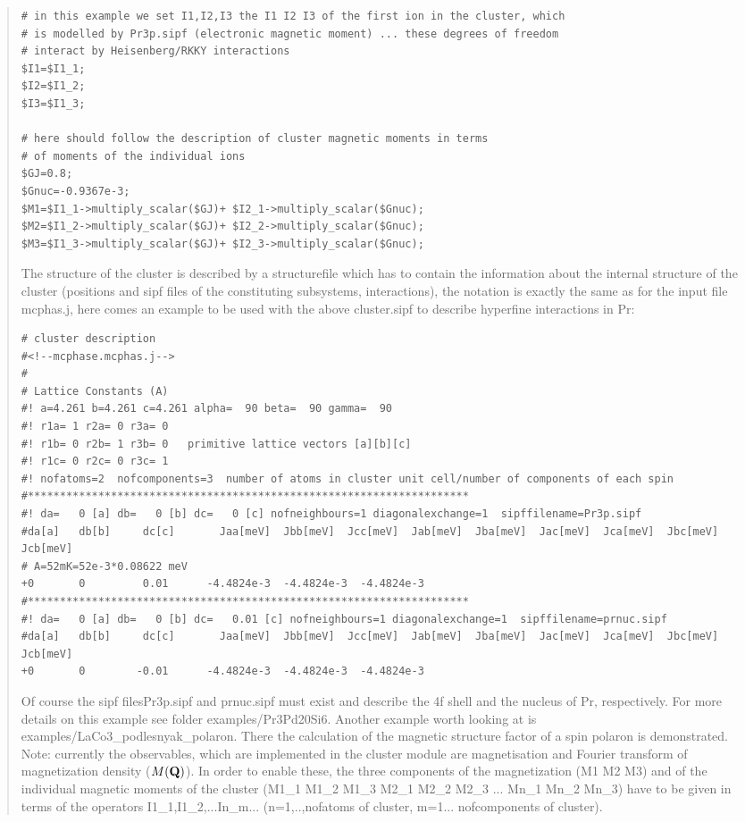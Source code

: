 \begin{quote}
\begin{verbatim}
# in this example we set I1,I2,I3 the I1 I2 I3 of the first ion in the cluster, which 
# is modelled by Pr3p.sipf (electronic magnetic moment) ... these degrees of freedom
# interact by Heisenberg/RKKY interactions
$I1=$I1_1;
$I2=$I1_2;
$I3=$I1_3;

# here should follow the description of cluster magnetic moments in terms
# of moments of the individual ions
$GJ=0.8;
$Gnuc=-0.9367e-3;
$M1=$I1_1->multiply_scalar($GJ)+ $I2_1->multiply_scalar($Gnuc);
$M2=$I1_2->multiply_scalar($GJ)+ $I2_2->multiply_scalar($Gnuc);
$M3=$I1_3->multiply_scalar($GJ)+ $I2_3->multiply_scalar($Gnuc); 
\end{verbatim}

The structure of the cluster is described by a structurefile which has
to contain the information about the internal structure of the cluster
(positions and sipf files of the constituting subsystems, interactions),
the notation is exactly the same as for the input file {\prg mcphas.j},
here comes an example to be used with the above {\prg cluster.sipf} to describe
hyperfine interactions in Pr:
\begin{verbatim}
# cluster description
#<!--mcphase.mcphas.j-->
#
# Lattice Constants (A)
#! a=4.261 b=4.261 c=4.261 alpha=  90 beta=  90 gamma=  90
#! r1a= 1 r2a= 0 r3a= 0
#! r1b= 0 r2b= 1 r3b= 0   primitive lattice vectors [a][b][c]
#! r1c= 0 r2c= 0 r3c= 1
#! nofatoms=2  nofcomponents=3  number of atoms in cluster unit cell/number of components of each spin
#*********************************************************************
#! da=   0 [a] db=   0 [b] dc=   0 [c] nofneighbours=1 diagonalexchange=1  sipffilename=Pr3p.sipf
#da[a]   db[b]     dc[c]       Jaa[meV]  Jbb[meV]  Jcc[meV]  Jab[meV]  Jba[meV]  Jac[meV]  Jca[meV]  Jbc[meV]  Jcb[meV]
# A=52mK=52e-3*0.08622 meV
+0       0         0.01      -4.4824e-3  -4.4824e-3  -4.4824e-3
#*********************************************************************
#! da=   0 [a] db=   0 [b] dc=   0.01 [c] nofneighbours=1 diagonalexchange=1  sipffilename=prnuc.sipf
#da[a]   db[b]     dc[c]       Jaa[meV]  Jbb[meV]  Jcc[meV]  Jab[meV]  Jba[meV]  Jac[meV]  Jca[meV]  Jbc[meV]  Jcb[meV]
+0       0        -0.01      -4.4824e-3  -4.4824e-3  -4.4824e-3
\end{verbatim}
Of course the sipf files{\prg Pr3p.sipf }and {\prg prnuc.sipf} must exist and describe
the 4f shell and the nucleus of Pr, respectively. For more details on this
example see folder {\prg examples/Pr3Pd20Si6}. Another example worth looking
at is {\prg examples/LaCo3\_podlesnyak\_polaron}. There the calculation of the 
magnetic structure factor of a spin polaron is demonstrated.
Note: currently the observables, which are implemented in the cluster module are 
magnetisation and Fourier transform of magnetization density ($M(\mathbf Q)$).
In order to enable these, the three components of the magnetization (M1 M2 M3) and of the 
individual magnetic moments of the cluster (M1\_1 M1\_2 M1\_3 M2\_1 M2\_2 M2\_3 ... Mn\_1 Mn\_2 Mn\_3)
have to be given in terms of the operators I1\_1,I1\_2,...In\_m... (n=1,..,nofatoms of cluster,
m=1... nofcomponents of cluster). 


\end{quote}
